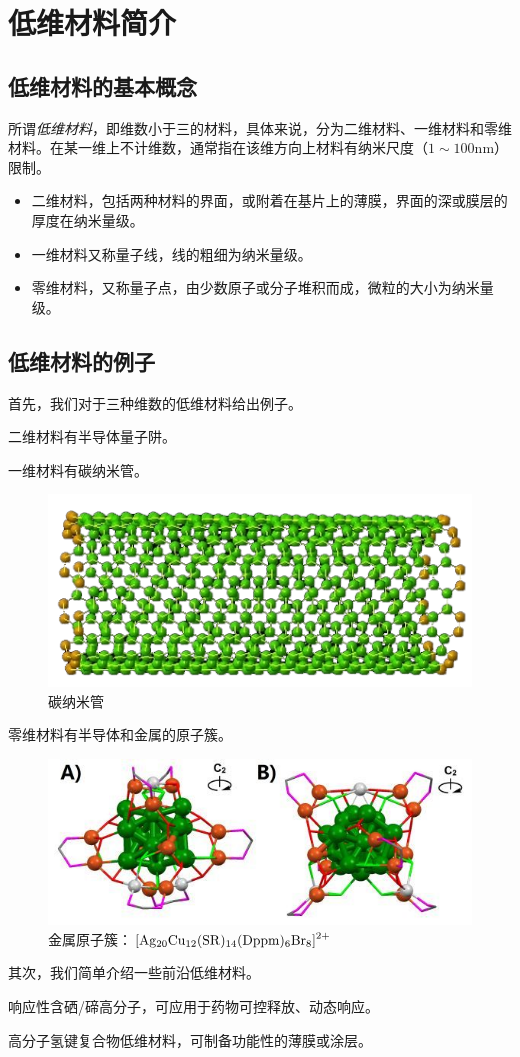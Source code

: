 
\chapter{低维材料简介}

\section{低维材料的基本概念}

所谓\textit{低维材料}，即维数小于三的材料，具体来说，分为二维材料、一维材料和零维材料。在某一维上不计维数，通常指在该维方向上材料有纳米尺度（$1\sim 100\si{\nano\meter}$）限制。

\begin{itemize}
    \item 二维材料，包括两种材料的界面，或附着在基片上的薄膜，界面的深或膜层的厚度在纳米量级。

    \item 一维材料又称量子线，线的粗细为纳米量级。

    \item 零维材料，又称量子点，由少数原子或分子堆积而成，微粒的大小为纳米量级。
\end{itemize}

\section{低维材料的例子}

首先，我们对于三种维数的低维材料给出例子。

二维材料有半导体量子阱。

一维材料有碳纳米管。

\begin{figure}
    \centering
    \includegraphics[scale=0.7]{img/碳纳米管}
    \caption{碳纳米管}
\end{figure}

零维材料有半导体和金属的原子簇。

\begin{figure}
    \centering
    \includegraphics[scale=0.7]{img/金属原子簇}
    \caption{金属原子簇：$\ce{[Ag_{20}Cu_{12}(SR)_{14}(Dppm)_6Br_8]^{2+}}$}
\end{figure}

其次，我们简单介绍一些前沿低维材料。

响应性含硒/碲高分子，可应用于药物可控释放、动态响应\cite{RN41}。

高分子氢键复合物低维材料，可制备功能性的薄膜或涂层。
